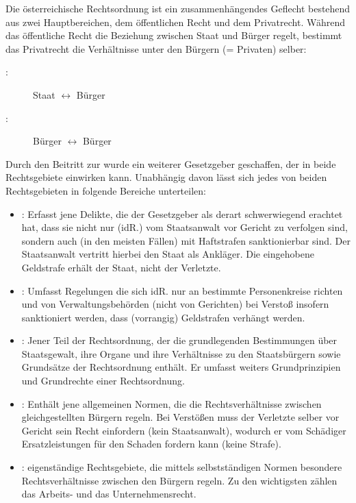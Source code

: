 Die österreichische Rechtsordnung ist ein zusammenhängendes Geflecht
bestehend aus zwei Hauptbereichen, dem öffentlichen Recht und dem
Privatrecht. Während das öffentliche Recht die Beziehung zwischen
Staat und Bürger regelt, bestimmt das Privatrecht die Verhältnisse
unter den Bürgern (= Privaten) selber:

\begin{description}
    \item[:] Staat ${\leftrightarrow}$ Bürger
    \item[:] Bürger ${\leftrightarrow}$ Bürger
\end{description}

Durch den Beitritt zur  wurde ein weiterer Gesetzgeber geschaffen,
der in beide Rechtsgebiete einwirken kann. Unabhängig davon lässt
sich jedes von beiden Rechts\-ge\-bieten in folgende
Bereiche unterteilen:

{
\begin{itemize}
    \item {}: Erfasst jene Delikte, die der
    Gesetzgeber als derart schwerwiegend erachtet hat, dass
    sie nicht nur (idR.) vom Staatsanwalt vor Gericht zu
    verfolgen sind,  sondern auch (in den meisten Fällen) mit
    Haftstrafen  sanktionierbar sind. Der Staatsanwalt
    vertritt hierbei  den Staat als Ankläger. Die eingehobene
    Geldstrafe  erhält der Staat, nicht der Verletzte.
    
    \item {}: Umfasst Regelungen die sich idR. nur an bestimmte Personenkreise richten und von Verwaltungsbehörden
    (nicht von Gerichten) bei Verstoß insofern sanktioniert werden, dass (vorrangig) Geldstrafen verhängt werden.
    
    \item {}: Jener Teil der Rechtsordnung, der die grundlegenden Bestimmungen über Staatsgewalt, ihre Organe und
    ihre Verhältnisse zu den Staatsbürgern sowie
    Grundsätze der Rechtsordnung enthält. Er umfasst
    weiters Grundprinzipien und Grundrechte einer
    Rechtsordnung. 
    
\end{itemize}
}{}{}{}{}



{
\begin{itemize}
    \item {}: Enthält jene allgemeinen Normen, die
    die Rechtsverhältnisse zwischen gleichgestellten Bürgern regeln.
    Bei Verstößen muss der Verletzte selber vor Gericht sein Recht
    einfordern (kein Staatsanwalt), wodurch er vom Schädiger
    Ersatzleistungen für den Schaden fordern kann (keine Strafe).
    
    \item {}: eigenständige Rechtsgebiete,
    die mittels selbstständigen Normen besondere Rechtsverhältnisse
    zwischen den Bürgern regeln. Zu den wichtigsten zählen das Arbeits-
    und das Unternehmensrecht.
    
\end{itemize}
}{}{}{}{}

